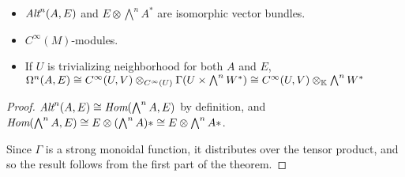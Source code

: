 \begin{theorem}
    \begin{itemize}
    
    \item $\operatorname{\textit{Alt}}^n(A, E)$ and $E \otimes \bigwedge^n A^*$ are isomorphic vector bundles.
    
    
    \item {} $C^\infty(M)$-modules.
    
    \item If $U$ is trivializing neighborhood for both $A$ and $E$, $\Omega^n(A, E) \cong C^\infty(U, V) \otimes_{C^\infty(U)} \Gamma(U \times \bigwedge^n W^*) \cong C^\infty(U, V) \otimes_{\mathbb{K}} \bigwedge^n W^*$
    
    
    \end{itemize}
\end{theorem}

\begin{proof}
$\operatorname{\textit{Alt}}^n(A, E) \cong \operatorname{\textit{Hom}}(\bigwedge^n A, E)$ by definition, and $\operatorname{\textit{Hom}}(\bigwedge^n A, E) \cong E \otimes (\bigwedge^n A)* \cong E \otimes \bigwedge^n A*$.

Since $\Gamma$ is a strong monoidal function, it distributes over the tensor product, and so the result follows from the first part of the theorem.
\end{proof}

\linea

